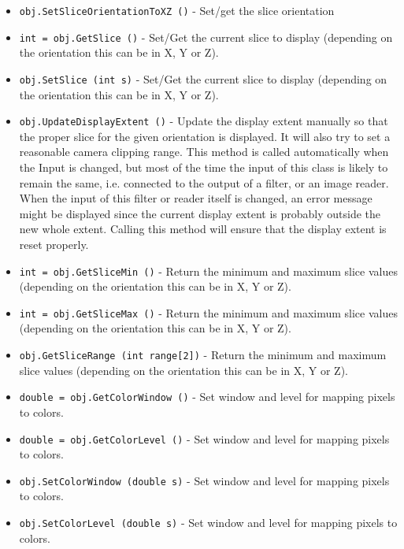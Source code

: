 \begin{itemize}
\item  \verb|obj.SetSliceOrientationToXZ ()| -  Set/get the slice orientation

\item  \verb|int = obj.GetSlice ()| -  Set/Get the current slice to display (depending on the orientation
 this can be in X, Y or Z).

\item  \verb|obj.SetSlice (int s)| -  Set/Get the current slice to display (depending on the orientation
 this can be in X, Y or Z).

\item  \verb|obj.UpdateDisplayExtent ()| -  Update the display extent manually so that the proper slice for the
 given orientation is displayed. It will also try to set a
 reasonable camera clipping range.
 This method is called automatically when the Input is changed, but
 most of the time the input of this class is likely to remain the same,
 i.e. connected to the output of a filter, or an image reader. When the
 input of this filter or reader itself is changed, an error message might
 be displayed since the current display extent is probably outside
 the new whole extent. Calling this method will ensure that the display
 extent is reset properly.

\item  \verb|int = obj.GetSliceMin ()| -  Return the minimum and maximum slice values (depending on the orientation
 this can be in X, Y or Z).

\item  \verb|int = obj.GetSliceMax ()| -  Return the minimum and maximum slice values (depending on the orientation
 this can be in X, Y or Z).

\item  \verb|obj.GetSliceRange (int range[2])| -  Return the minimum and maximum slice values (depending on the orientation
 this can be in X, Y or Z).

\item  \verb|double = obj.GetColorWindow ()| -  Set window and level for mapping pixels to colors.

\item  \verb|double = obj.GetColorLevel ()| -  Set window and level for mapping pixels to colors.

\item  \verb|obj.SetColorWindow (double s)| -  Set window and level for mapping pixels to colors.

\item  \verb|obj.SetColorLevel (double s)| -  Set window and level for mapping pixels to colors.


\end{itemize}
